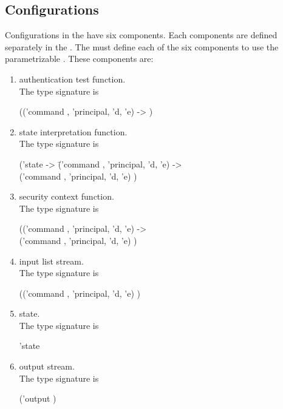 \documentclass[../../main/main.tex]{subfiles}
\begin{document}
\subsection{Configurations}
Configurations in the  have six components.  Each components are defined separately in the .  The  must define each of the six components to use the parametrizable .  These components are:
\begin{enumerate}
\item authentication test function.  \\
The type signature is 

\hspace{0.5cm}  (('command , 'principal, 'd, 'e)  -> )

\item state interpretation function.  \\
The type signature is
\begin{tabbing}
\hspace{0.5cm}('state -> \=('command , 'principal, 'd, 'e)   -> \\
				      \>('command , 'principal, 'd, 'e)  ) 
\end{tabbing}
\item security context function.  \\
The type signature is 

 \hspace{0.5cm}   (('command , 'principal, 'd, 'e)   -> \\
\hspace{0.5cm}    ('command , 'principal, 'd, 'e)  ) 

\item input list stream.  \\
The type signature is

 \hspace{0.5cm}  (('command , 'principal, 'd, 'e)   ) \

\item state.  \\
The type signature is

\hspace{0.5cm}   'state

\item output stream.  \\
The type signature is 

\hspace{0.5cm} ('output )
\end{enumerate}
\end{document}
